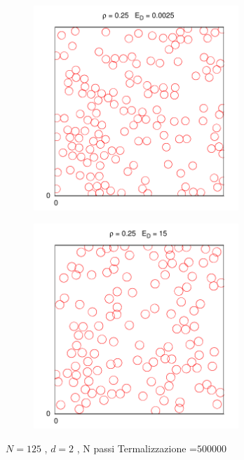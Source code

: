 \begin{figure}[htbp]
        \begin{subfigure}[b]{0.5\textwidth}
                \centering
                \includegraphics[width=0.85\textwidth]{Immagini/Soffici/SnapSolidoFreddo_2D_Nuclea}
        \end{subfigure}
         \begin{subfigure}[b]{0.5\textwidth}
                \centering
                \includegraphics[width=0.85\textwidth]{Immagini/Soffici/SnapLiquido_2D}
        \end{subfigure}
		
		 \centering  \footnotesize{$N= 125$ , $d=2$ , N passi Termalizzazione =$ 500000 $}
		\label{fig: snap2d_soft}
\end{figure}
